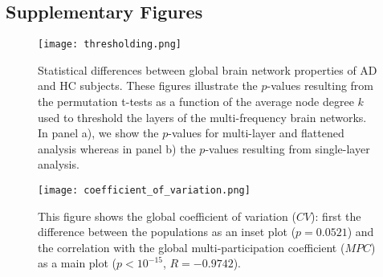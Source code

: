 


\renewcommand{\thefigure}{S\arabic{figure}}
\renewcommand{\thetable}{S\arabic{table}}
\renewcommand{\theequation}{S\arabic{equation}}

\setcounter{figure}{0}
\setcounter{table}{0}
\setcounter{equation}{0}

\subsection*{Supplementary Figures} \label{subsec:FigS}

\begin{figure}[!ht]
	\centering
	\texttt{[image: thresholding.png]}
	\caption{Statistical differences between global brain network properties of AD and HC subjects.
	These figures illustrate the $p$-values resulting from the permutation t-tests as a function of the average node degree $k$ used to threshold the layers of the multi-frequency brain networks. In panel a), we show the $p$-values for multi-layer and flattened analysis whereas in panel b) the $p$-values resulting from single-layer analysis.}
	\label{fig:thresholding}
\end{figure}

\newpage
\begin{figure}[!ht]
	\centering
	\texttt{[image: coefficient\_of\_variation.png]}
	\caption{This figure shows the global coefficient of variation ($CV$): first the difference between the populations as an inset plot ($p=0.0521$) and the correlation with the global multi-participation coefficient ($MPC$) as a main plot ($p<10^{-15}$, $R=-0.9742$).}
	\label{fig:coefficient_of_variation}
\end{figure}


